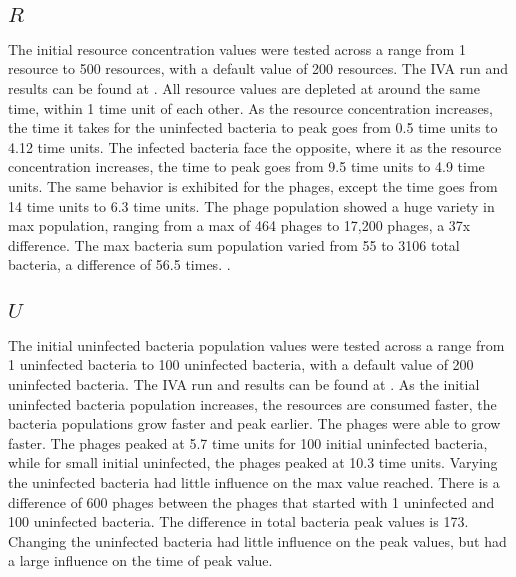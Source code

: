 \subsection{$R$}
The initial resource concentration values were tested across a range from 1 resource to 500 resources, with a default value of 200 resources. 
The IVA run and results can be found at . 
All resource values are depleted at around the same time, within 1 time unit of each other. 
As the resource concentration increases, the time it takes for the uninfected bacteria to peak goes from 0.5 time units to 4.12 time units. 
The infected bacteria face the opposite, where it as the resource concentration increases, the time to peak goes from 9.5 time units to 4.9 time units. 
The same behavior is exhibited for the phages, except the time goes from 14 time units to 6.3 time units. 
The phage population showed a huge variety in max population, ranging from a max of 464 phages to 17,200 phages, a 37x difference. 
The max bacteria sum population varied from 55 to 3106 total bacteria, a difference of 56.5 times. . 

\subsection{$U$}
The initial uninfected bacteria population values were tested across a range from 1 uninfected bacteria to 100 uninfected bacteria, with a default value of 200 uninfected bacteria. 
The IVA run and results can be found at . 
As the initial uninfected bacteria population increases, the resources are consumed faster, the bacteria populations grow faster and peak earlier. The phages were able to grow faster. The phages peaked at 5.7 time units for 100 initial uninfected bacteria, while for small initial uninfected, the phages peaked at 10.3 time units. Varying the uninfected bacteria had little influence on the max value reached. There is a difference of 600 phages between the phages that started with 1 uninfected and 100 uninfected bacteria. The difference in total bacteria peak values is 173. Changing the uninfected bacteria had little influence on the peak values, but had a large influence on the time of peak value. \\

